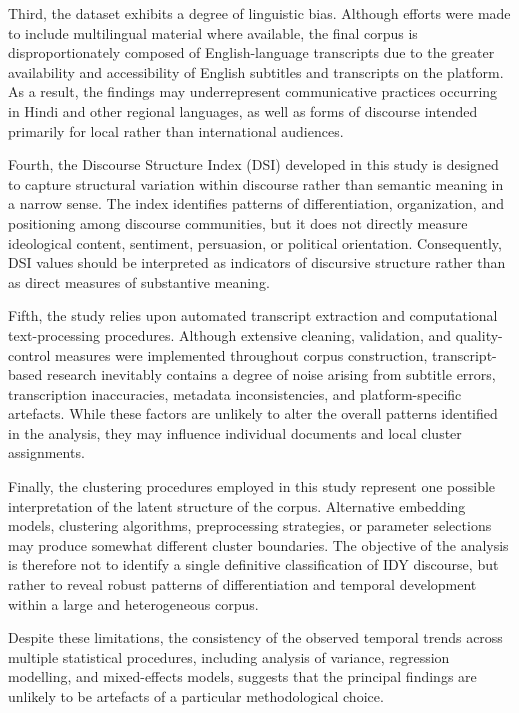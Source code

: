 \documentclass[11pt]{article}
\begin{document}
Third, the dataset exhibits a degree of linguistic bias. Although efforts were made to include multilingual material
where available, the final corpus is disproportionately composed of English-language transcripts due to the greater
availability and accessibility of English subtitles and transcripts on the platform. As a result, the findings may
underrepresent communicative practices occurring in Hindi and other regional languages, as well as forms of discourse
intended primarily for local rather than international audiences.


Fourth, the Discourse Structure Index (DSI) developed in this study is designed to capture structural variation within
discourse rather than semantic meaning in a narrow sense. The index identifies patterns of differentiation,
organization, and positioning among discourse communities, but it does not directly measure ideological content,
sentiment, persuasion, or political orientation. Consequently, DSI values should be interpreted as indicators of
discursive structure rather than as direct measures of substantive meaning.


Fifth, the study relies upon automated transcript extraction and computational text-processing procedures. Although
extensive cleaning, validation, and quality-control measures were implemented throughout corpus construction,
transcript-based research inevitably contains a degree of noise arising from subtitle errors, transcription
inaccuracies, metadata inconsistencies, and platform-specific artefacts. While these factors are unlikely to alter the
overall patterns identified in the analysis, they may influence individual documents and local cluster assignments.


Finally, the clustering procedures employed in this study represent one possible interpretation of the latent structure
of the corpus. Alternative embedding models, clustering algorithms, preprocessing strategies, or parameter selections
may produce somewhat different cluster boundaries. The objective of the analysis is therefore not to identify a single
definitive classification of IDY discourse, but rather to reveal robust patterns of differentiation and temporal
development within a large and heterogeneous corpus.


Despite these limitations, the consistency of the observed temporal trends across multiple statistical procedures,
including analysis of variance, regression modelling, and mixed-effects models, suggests that the principal findings are
unlikely to be artefacts of a particular methodological choice.
\end{document}
